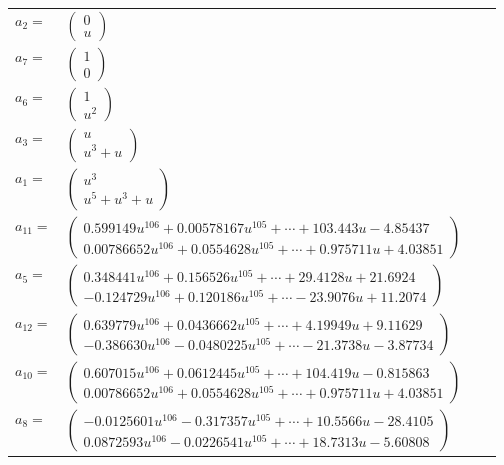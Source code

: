 \documentclass[1p]{elsarticle_modified}
\theoremstyle{definition}
\begin{document}
\begin{tabular}{m{7pt} m{180pt} m{7pt} m{180pt} }
\flushright $a_{2}=$&$\begin{pmatrix}0\\u\end{pmatrix}$ \\
\flushright $a_{7}=$&$\begin{pmatrix}1\\0\end{pmatrix}$ \\
\flushright $a_{6}=$&$\begin{pmatrix}1\\u^2\end{pmatrix}$ \\
\flushright $a_{3}=$&$\begin{pmatrix}u\\u^3+u\end{pmatrix}$ \\
\flushright $a_{1}=$&$\begin{pmatrix}u^3\\u^5+u^3+u\end{pmatrix}$ \\
\flushright $a_{11}=$&$\begin{pmatrix}0.599149 u^{106}+0.00578167 u^{105}+\cdots+103.443 u-4.85437\\0.00786652 u^{106}+0.0554628 u^{105}+\cdots+0.975711 u+4.03851\end{pmatrix}$ \\
\flushright $a_{5}=$&$\begin{pmatrix}0.348441 u^{106}+0.156526 u^{105}+\cdots+29.4128 u+21.6924\\-0.124729 u^{106}+0.120186 u^{105}+\cdots-23.9076 u+11.2074\end{pmatrix}$ \\
\flushright $a_{12}=$&$\begin{pmatrix}0.639779 u^{106}+0.0436662 u^{105}+\cdots+4.19949 u+9.11629\\-0.386630 u^{106}-0.0480225 u^{105}+\cdots-21.3738 u-3.87734\end{pmatrix}$ \\
\flushright $a_{10}=$&$\begin{pmatrix}0.607015 u^{106}+0.0612445 u^{105}+\cdots+104.419 u-0.815863\\0.00786652 u^{106}+0.0554628 u^{105}+\cdots+0.975711 u+4.03851\end{pmatrix}$ \\
\flushright $a_{8}=$&$\begin{pmatrix}-0.0125601 u^{106}-0.317357 u^{105}+\cdots+10.5566 u-28.4105\\0.0872593 u^{106}-0.0226541 u^{105}+\cdots+18.7313 u-5.60808\end{pmatrix}$ \\

\end{tabular}
\end{document}

